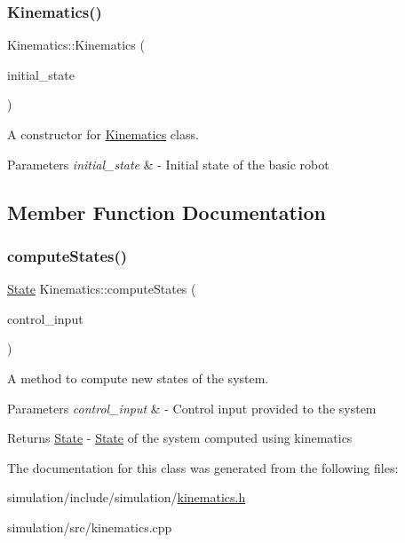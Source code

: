 \subsubsection{\texorpdfstring{Kinematics()}{Kinematics()}}
{\footnotesize\ttfamily Kinematics\+::\+Kinematics (\begin{DoxyParamCaption}\item[{const \hyperlink{structState}{State} \&}]{initial\+\_\+state }\end{DoxyParamCaption})}



A constructor for \hyperlink{classKinematics}{Kinematics} class. 


\begin{DoxyParams}{Parameters}
{\em initial\+\_\+state} & -\/ Initial state of the basic robot \\
\hline
\end{DoxyParams}


\subsection{Member Function Documentation}
\mbox{\label{classKinematics_abc359954c01ed158fe090e01b5539f06}} 
\subsubsection{\texorpdfstring{compute\+States()}{computeStates()}}
{\footnotesize\ttfamily \hyperlink{structState}{State} Kinematics\+::compute\+States (\begin{DoxyParamCaption}\item[{ackermann\+\_\+msgs\+::\+Ackermann\+Drive\+Stamped \&}]{control\+\_\+input }\end{DoxyParamCaption})}



A method to compute new states of the system. 


\begin{DoxyParams}{Parameters}
{\em control\+\_\+input} & -\/ Control input provided to the system \\
\hline
\end{DoxyParams}
\begin{DoxyReturn}{Returns}
\hyperlink{structState}{State} -\/ \hyperlink{structState}{State} of the system computed using kinematics 
\end{DoxyReturn}


The documentation for this class was generated from the following files\+:\begin{DoxyCompactItemize}
\item 
simulation/include/simulation/\hyperlink{kinematics_8h}{kinematics.\+h}\item 
simulation/src/kinematics.\+cpp\end{DoxyCompactItemize}
